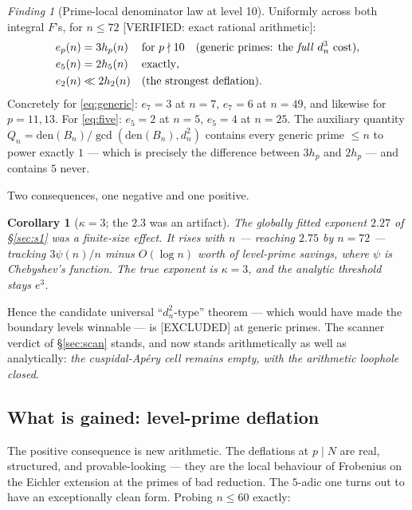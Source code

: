 \documentclass[11pt,reqno]{amsart}
\theoremstyle{plain}
\newtheorem{corollary}[theorem]{Corollary}
\theoremstyle{definition}
\theoremstyle{remark}
\newtheorem{finding}[theorem]{Finding}
\newcommand{\dn}{d_n}
\newcommand{\VerifiedR}[1]{\textup{\textsf{[VERIFIED: #1]}}}
\newcommand{\Excluded}{\textup{\textsf{[EXCLUDED]}}}
\begin{document}
\begin{finding}[Prime-local denominator law at level 10]
\label{find:kappa}
Uniformly across both integral $F$'s, for $n\le72$
\VerifiedR{exact rational arithmetic}:
\begin{align}
  e_p(n) &= 3h_p(n) &&\text{for } p\nmid 10 \quad\text{(generic primes:
   the \emph{full} $\dn^3$ cost)},\label{eq:generic}\\
  e_5(n) &= 2h_5(n) &&\text{exactly},\label{eq:five}\\
  e_2(n) &\ll 2h_2(n) &&\text{(the strongest deflation).}\label{eq:two}
\end{align}
Concretely for \eqref{eq:generic}: $e_7=3$ at $n=7$, $e_7=6$ at $n=49$,
and likewise for $p=11,13$. For \eqref{eq:five}: $e_5=2$ at $n=5$,
$e_5=4$ at $n=25$. The auxiliary quantity
$Q_n=\mathrm{den}(B_n)/\gcd(\mathrm{den}(B_n),\dn^2)$ contains every
generic prime $\le n$ to power exactly $1$ --- which is precisely the
difference between $3h_p$ and $2h_p$ --- and contains $5$ never.
\end{finding}

Two consequences, one negative and one positive.

\begin{corollary}[$\kappa=3$; the $2.3$ was an artifact]
The globally fitted exponent $2.27$ of \S\ref{sec:s1} was a finite-size
effect. It \emph{rises} with $n$ --- reaching $2.75$ by $n=72$ --- tracking
$3\psi(n)/n$ minus $O(\log n)$ worth of level-prime savings, where
$\psi$ is Chebyshev's function. The true exponent is
$\boxed{\kappa=3}$, and the analytic threshold stays $e^3$.
\end{corollary}

Hence the candidate universal ``$\dn^2$-type'' theorem --- which would have
made the boundary levels winnable --- is \Excluded{} at generic primes.
The scanner verdict of \S\ref{sec:scan} stands, and now stands
arithmetically as well as analytically: \emph{the cuspidal-Ap\'ery cell
remains empty, with the arithmetic loophole closed}.

\subsection{What is gained: level-prime deflation}

The positive consequence is new arithmetic. The deflations at $p\mid N$
are real, structured, and provable-looking --- they are the local behaviour
of Frobenius on the Eichler extension at the primes of bad reduction. The
$5$-adic one turns out to have an exceptionally clean form. Probing
$n\le60$ exactly:
\end{document}
